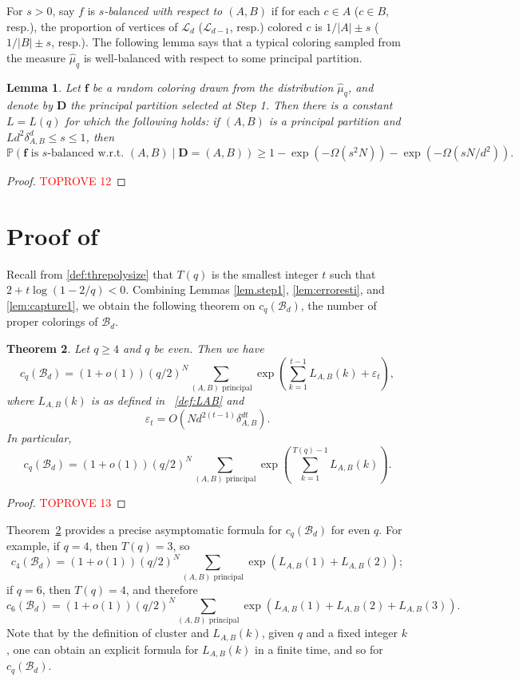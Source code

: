 \documentclass{amsart}
\newtheorem{thm}{Theorem}[section]
\newtheorem{lem}[thm]{Lemma}
\theoremstyle{definition}
\newcommand{\bO}{O}
\newcommand{\thre}{T}
\newcommand{\cB}{\mathcal{B} }
\newcommand{\cL}{\mathcal{L} }
\newcommand{\beq}[1]{\begin{equation}\label{#1}}
\newcommand{\enq}[0]{\end{equation}}
\newcommand{\0}[0]{\emptyset}
\newcommand{\pr}[0]{\mathbb{P}}
\begin{document}
For $s>0$, say $f$ is \textit{$s$-balanced with respect to $(A, B)$} if for each $c\in A$ ($c \in B$, resp.), the proportion of vertices of $\cL_d$ ($\cL_{d-1}$, resp.) colored $c$ is $1/|A|\pm s$ ($1/|B|\pm s$, resp.). The following lemma says that a typical coloring sampled from the measure $\hat{\mu}_q$ is well-balanced with respect to some principal partition.



\begin{lem}\label{lem:defect.shorten}
Let $\mathbf f$ be a random coloring drawn from the distribution $\hat{\mu}_q$, and denote by $\mathbf D$ the principal partition selected at Step 1.
Then there is a constant $L=L(q)$ for which the following holds: if $(A, B)$ is a principal partition and $Ld^2\delta_{A, B}^d \leq s\leq 1$, then
\[
\pr\left(\text{$\mathbf f$ is $s$-balanced w.r.t. $(A, B)$} \mid \mathbf D=(A, B) \right) \geq 1 - \exp\left(-\Omega\left(s^2N\right)\right) - \exp\left(-\Omega\left(sN/d^2\right)\right).
\]

\end{lem}


\begin{proof}\textcolor{red}{TOPROVE 12}\end{proof}

\section{Proof of }\label{sec.realMT}
Recall from \eqref{def:threpolysize} that $T(q)$ is the smallest integer $t$ such that $2 + t\log(1 - 2/q)< 0$.
Combining Lemmas \ref{lem.step1}, \ref{lem:erroresti}, and \ref{lem:capture1}, we obtain the following theorem on $c_q(\cB_d)$, the number of proper colorings of $\cB_d$.
\begin{thm}\label{MT1'}
Let $q \ge 4$ and $q$ be even. Then we have 
\[
c_q(\cB_d) = (1 + o(1))(q/2)^{N} \sum_{(A, B) \text{ principal}}\exp\left(\sum_{k=1}^{t-1}L_{A, B}(k) + \varepsilon_t\right),
\]
where $L_{A, B}(k)$ is as defined in ~\eqref{def:LAB} and  
\beq{eps.bound} \varepsilon_t = \bO\left(Nd^{2(t-1)}\delta_{A, B}^{dt}\right).\enq
In particular, 
\[
c_q(\cB_d) = (1 + o(1))(q/2)^{N} \sum_{(A, B) \text{ principal}}\exp\left(\sum_{k=1}^{\thre(q)-1}L_{A, B}(k)\right).
\]
\end{thm}
\begin{proof}\textcolor{red}{TOPROVE 13}\end{proof}

Theorem~\ref{MT1'} provides a precise asymptomatic formula for $c_q(\cB_d)$ for even $q$. For example, if $q=4$, then $\thre(q)=3$, so
\[
c_4(\cB_d) = (1 + o(1))(q/2)^{N} \sum_{(A, B) \text{ principal}}\exp\left(L_{A, B}(1) + L_{A, B}(2)\right);
\]
if $q=6$, then $\thre(q)=4$, and therefore
\[
c_6(\cB_d) = (1 + o(1))(q/2)^{N} \sum_{(A, B) \text{ principal}}\exp\left(L_{A, B}(1) + L_{A, B}(2) + L_{A, B}(3)\right).
\]
Note that by the definition of cluster and $L_{A, B}(k)$, given $q$ and a fixed integer $k$, one can obtain an explicit formula for $L_{A, B}(k)$ in a finite time, and so for $c_q(\cB_d)$.
\end{document}
